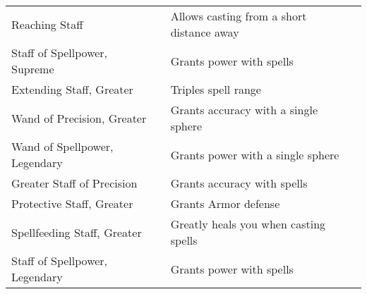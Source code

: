 \begin{longtabuwrapper}
\begin{longtabu}{l l X l}
Reaching Staff &  & Allows casting from a short distance away & \pageref{item:Reaching Staff} \\
Staff of Spellpower, Supreme &  & Grants  power with spells & \pageref{item:Staff of Spellpower, Supreme} \\
Extending Staff, Greater &  & Triples spell range & \pageref{item:Extending Staff, Greater} \\
Wand of Precision, Greater &  & Grants  accuracy with a single sphere & \pageref{item:Wand of Precision, Greater} \\
Wand of Spellpower, Legendary &  & Grants  power with a single sphere & \pageref{item:Wand of Spellpower, Legendary} \\
Greater Staff of Precision &  & Grants  accuracy with spells & \pageref{item:Greater Staff of Precision} \\
Protective Staff, Greater &  & Grants  Armor defense & \pageref{item:Protective Staff, Greater} \\
Spellfeeding Staff, Greater &  & Greatly heals you when casting spells & \pageref{item:Spellfeeding Staff, Greater} \\
Staff of Spellpower, Legendary &  & Grants  power with spells & \pageref{item:Staff of Spellpower, Legendary} \\
\end{longtabu}
\end{longtabuwrapper}
